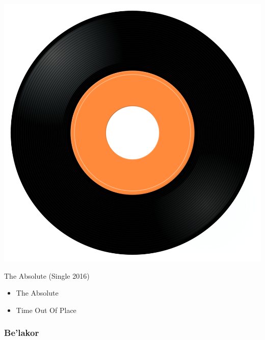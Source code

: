 \begin{minipage}[t]{0.25\textwidth}\vspace{0pt}
\captionsetup{type=figure}
\includegraphics[width=\textwidth]{Images/cover.png}
\caption*{The Absolute (Single 2016)}
\end{minipage}
\begin{minipage}[t]{0.25\textwidth}\vspace{0pt}
\begin{itemize}[nosep,leftmargin=1em,labelwidth=*,align=left]
	\setlength{\itemsep}{0pt}
	\item The Absolute
	\item Time Out Of Place 
\end{itemize}
\end{minipage}

\subsubsection{Be'lakor}

